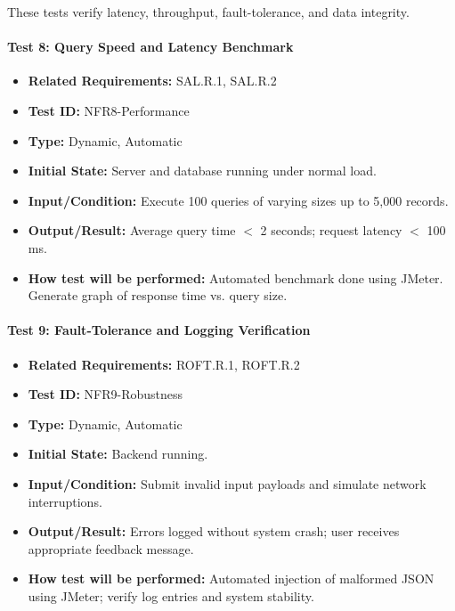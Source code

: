 \documentclass[12pt, titlepage]{article}
\begin{document}
These tests verify latency, throughput, fault-tolerance, and data integrity.

\paragraph{Test 8: Query Speed and Latency Benchmark}
\begin{itemize}
    \item \textbf{Related Requirements:} SAL.R.1, SAL.R.2
    \item \textbf{Test ID:} NFR8-Performance
    \item \textbf{Type:} Dynamic, Automatic
    \item \textbf{Initial State:} Server and database running under normal load.
    \item \textbf{Input/Condition:} Execute 100 queries of varying sizes up to 5,000 records.
    \item \textbf{Output/Result:} Average query time $<$ 2 seconds; request latency $<$ 100 ms.
    \item \textbf{How test will be performed:} Automated benchmark done using JMeter. Generate graph of response time vs. query size.
\end{itemize}

\paragraph{Test 9: Fault-Tolerance and Logging Verification}
\begin{itemize}
    \item \textbf{Related Requirements:} ROFT.R.1, ROFT.R.2
    \item \textbf{Test ID:} NFR9-Robustness
    \item \textbf{Type:} Dynamic, Automatic
    \item \textbf{Initial State:} Backend running.
    \item \textbf{Input/Condition:} Submit invalid input payloads and simulate network interruptions.
    \item \textbf{Output/Result:} Errors logged without system crash; user receives appropriate feedback message.
    \item \textbf{How test will be performed:} Automated injection of malformed JSON using JMeter; verify log entries and system stability.
\end{itemize}
\end{document}
